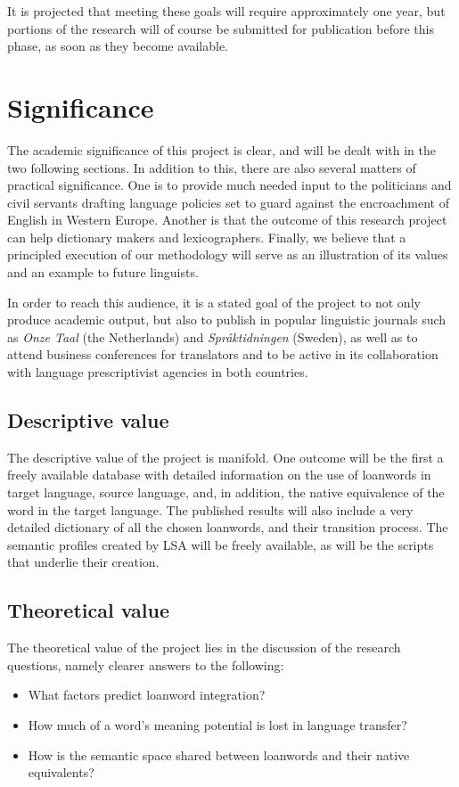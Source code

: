 \documentclass[a4paper]{article}
\begin{document}
It is projected that meeting these goals will require approximately one year, but portions of the research will of course be submitted for publication before this phase, as soon as they become available.



\section{Significance}
The academic significance of this project is clear, and will be dealt with in the two following sections. In addition to this, there are also several matters of  practical significance. One is to provide much needed input to the politicians and civil servants drafting language policies set to guard against the encroachment of English in Western Europe. Another is that the outcome of this research project can help dictionary makers and lexicographers. Finally, we believe that a principled execution of our methodology will serve as an illustration of its values and an example to future linguists.

In order to reach this audience, it is a stated goal of the project to not only produce academic output, but also to publish in popular linguistic journals such as \emph{Onze Taal} (the Netherlands) and \emph{Spr\aa ktidningen} (Sweden), as well as to attend business conferences for translators and to be active in its collaboration with language prescriptivist agencies in both countries. 


\subsection{Descriptive value}
The descriptive value of the project is manifold. One outcome will be the first a freely available database with detailed information on the use of loanwords in target language, source language, and, in addition, the native equivalence of the word in the target language. The published results will also include a very detailed dictionary of all the chosen loanwords, and their transition process. The semantic profiles created by LSA will be freely available, as will be the scripts that underlie their creation. 



\subsection{Theoretical value}
The theoretical value of the project lies in the discussion of the research questions, namely clearer answers to the following:
\begin{itemize}
	\item What factors predict loanword integration?
	\item How much of a word's meaning potential is lost in language transfer?
	\item How is the semantic space shared between loanwords and their native equivalents?	
\end{itemize}
\end{document}
